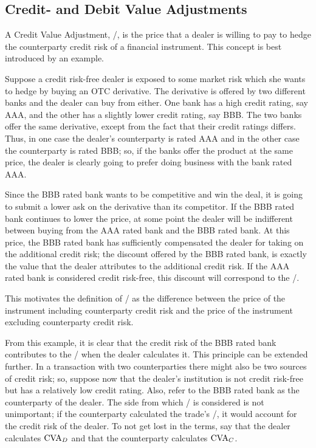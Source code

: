 \documentclass[main.tex]{subfiles}
\begin{document}
    \subsection{Credit- and Debit Value Adjustments}
        A Credit Value Adjustment, \CVA/, is the price that a dealer is willing to pay 
        to hedge the counterparty credit risk of a financial instrument.
        This concept is best introduced by an example. 
        
        \begin{example}
            Suppose a credit risk-free dealer is exposed to some market risk 
            which she wants to hedge by buying an OTC derivative.
            The derivative is offered by two different banks and the dealer can buy from either.
            One bank has a high credit rating, say AAA, and the other has a slightly lower credit rating, say BBB. 
            The two banks offer the same derivative, except from the fact that their credit ratings differs.
            Thus, in one case the dealer's counterparty is rated AAA and in the other case the counterparty is rated BBB;
            so, if the banks offer the product at the same price, 
            the dealer is clearly going to prefer doing business with the bank rated AAA.

            Since the BBB rated bank wants to be competitive and win the deal,
            it is going to submit a lower ask on the derivative than its competitor.
            If the BBB rated bank continues to lower the price, 
            at some point the dealer will be indifferent between buying 
            from the AAA rated bank and the BBB rated bank.
            At this price, the BBB rated bank has sufficiently compensated the dealer for taking on the additional credit risk;
            the discount offered by the BBB rated bank, 
            is exactly the value that the dealer attributes to the additional credit risk. 
            If the AAA rated bank is considered credit risk-free, this discount will correspond to the \CVA/.

            This motivates the definition of \CVA/ as the difference between the price of the instrument 
            including counterparty credit risk and the price of the instrument excluding counterparty credit risk.
        \end{example}

        From this example, it is clear that the credit risk of the BBB rated bank contributes to the \CVA/
        when the dealer calculates it.
        This principle can be extended further.
        In a transaction with two counterparties there might also be two sources of credit risk;
        so, suppose now that the dealer's institution is not credit risk-free 
        but has a relatively low credit rating.
        Also, refer to the BBB rated bank as the counterparty of the dealer.
        The side from which \CVA/ is considered is not unimportant;
        if the counterparty calculated the trade's \CVA/, it would account for the credit risk of the dealer.
        To not get lost in the terms, say that the dealer calculates $\CVA/_{D}$ 
        and that the counterparty calculates $\CVA/_{C}$.
\end{document}
